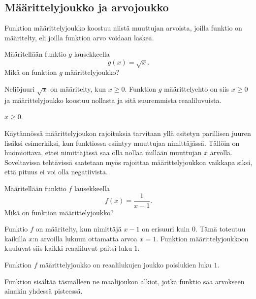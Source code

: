 \subsection*{Määrittelyjoukko ja arvojoukko}

Funktion määrittelyjoukko koostuu niistä muuttujan arvoista, joilla
funktio on määritelty, eli joilla funktion arvo voidaan laskea.

\begin{esimerkki}
	 Määritellään funktio $g$ lausekkeella \[ g(x) = \sqrt{x}. \]
	 Mikä on funktion $g$ määrittelyjoukko?
	 \begin{esimratk}
		Neliöjuuri $\sqrt{x}$ on määritelty, kun $x\geq{0}$. Funktion $g$ määrittelyehto on siis $x\geq{0}$ ja määrittelyjoukko koostuu nollasta ja sitä suuremmista reaaliluvuista.
	 \end{esimratk}
	 \begin{esimvast}
	  $x\geq{0}$.
	 \end{esimvast}
\end{esimerkki}

Käytännössä määrittelyjoukon rajoituksia tarvitaan yllä esitetyn parillisen juuren lisäksi esimerkiksi, kun funktiossa esiintyy muuttujaa nimittäjässä.
Tällöin on huomioitava, ettei nimittäjässä saa olla nollaa millään muuttujan $x$ arvolla. 
Soveltavissa tehtävissä saatetaan myös rajoittaa määrittelyjoukkoa vaikkapa siksi, että pituus ei voi olla negatiivista.

\begin{esimerkki}
	Määritellään funktio $f$ lausekkeella \[ f(x) = \frac{1}{x-1}. \]
	Mikä on funktion määrittelyjoukko?
	\begin{esimratk}
		Funktio $f$ on määritelty, kun nimittäjä $x-1$ on erisuuri kuin 0.
		Tämä toteutuu kaikilla $x$:n arvoilla lukuun ottamatta arvoa $x = 1$.
		Funktion määrittelyjoukkoon kuuluvat siis kaikki reaaliluvut paitsi luku $1$.
	\end{esimratk}
	\begin{esimvast}
		Funktion $f$ määrittelyjoukko on reaalilukujen joukko poislukien luku $1$.
	\end{esimvast}
\end{esimerkki}


Funktion  sisältää täsmälleen ne maalijoukon alkiot,
jotka funktio saa arvokseen ainakin yhdessä pisteessä.


